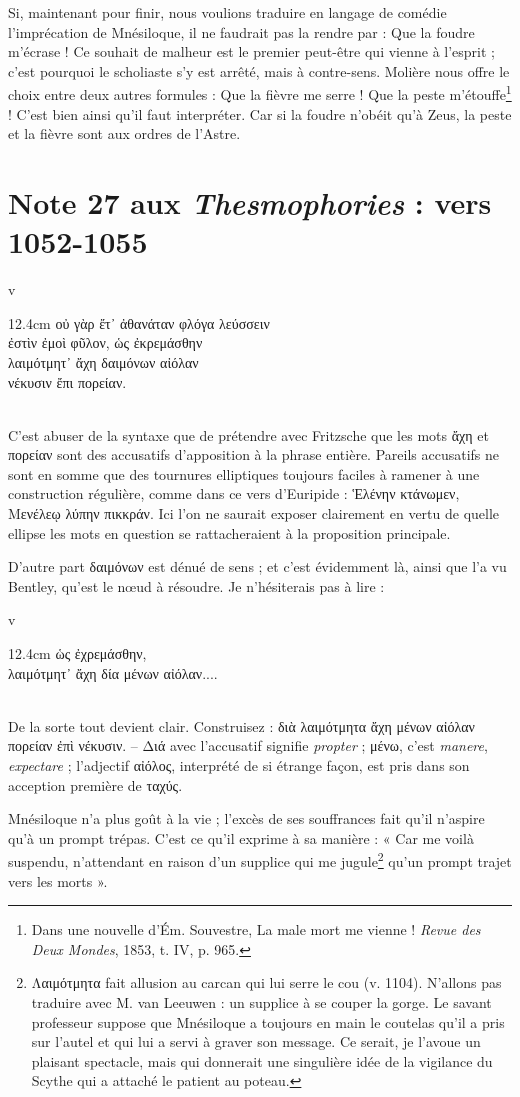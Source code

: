 \documentclass{book}%
\newcommand{\italique}[1]{\textit{#1}}%
\newcommand{\espace}[1]{\hspace{#1}}%
\newlength{\larg}%
\newcommand{\decalage}[1]{%
\settowidth{\larg}{#1}%
\espace{\larg}%
}
\newcommand{\fantome}{{\color{white}v}}
\newcommand{\Note}[1]{\section*{#1}%
\addcontentsline{toc}{section}{#1}}
\newcommand{\note}[1]{\footnote{#1}}
\newcommand{\citComm}[1]{\fantome\\
\espace{1cm}\begin{minipagewithmarginpars}{12.4cm}%
#1
\end{minipagewithmarginpars}%
}
\begin{document}
Si, maintenant pour finir, nous voulions traduire en langage de comédie l'imprécation de Mnésiloque, il ne faudrait pas la rendre par : Que la foudre m'écrase ! Ce souhait de malheur est le premier peut-être qui vienne à l'esprit ; c'est pourquoi le scholiaste s'y est arrêté, mais à contre-sens. Molière nous offre le choix entre deux autres formules : Que la fièvre me serre ! Que la peste m'étouffe\note{Dans une nouvelle d'Ém. Souvestre, La male mort me vienne ! \italique{Revue des Deux Mondes}, 1853, t. IV, p. 965.} ! C'est bien ainsi qu'il faut interpréter. Car si la foudre n'obéit qu'à Zeus, la peste et la fièvre sont aux ordres de l'Astre.



\Note{Note 27 aux \italique{Thesmophories} : vers 1052-1055}


\citComm{οὐ γὰρ ἔτ᾽ ἀθανάταν φλόγα λεύσσειν\\
	ἐστὶν ἐμοὶ φῦλον, ὡς ἐκρεμάσθην\\
	λαιμότμητ᾽ ἄχη δαιμόνων αἰόλαν\\
	νέκυσιν ἔπι πορείαν.}\\

C'est abuser de la syntaxe que de prétendre avec Fritzsche que les mots ἄχη et πορείαν sont des accusatifs d'apposition à la phrase entière. Pareils accusatifs ne sont en somme que des tournures elliptiques toujours faciles à ramener à une construction régulière, comme dans ce vers d'Euripide : Ἑλένην κτάνωμεν, Μενέλεῳ λύπην πικκράν. Ici l'on ne saurait exposer clairement en vertu de quelle ellipse les mots en question se rattacheraient à la proposition principale. 

D'autre part δαιμόνων est dénué de sens ; et c'est évidemment là, ainsi que l'a vu Bentley, qu'est le nœud à résoudre. Je n'hésiterais pas à lire :

\citComm{\decalage{ἐστὶν ἐμοὶ φῦλον, }ὡς ἐχρεμάσθην,\\
	λαιμότμητ᾽ ἄχη δία μένων αἰόλαν....}\\

De la sorte tout devient clair. Construisez : διὰ λαιμότμητα ἄχη μένων αἰόλαν πορείαν ἐπὶ νέκυσιν. -- Διά avec l'accusatif signifie \italique{propter} ; μένω, c'est \italique{manere}, \italique{expectare} ; l'adjectif αἰόλος, interprété de si étrange façon, est pris dans son acception première de ταχύς.

Mnésiloque n'a plus goût à la vie ; l'excès de ses souffrances fait qu'il n'aspire qu'à un prompt trépas. C'est ce qu'il exprime à sa manière : « Car me voilà suspendu, n'attendant en raison d'un supplice qui me jugule\note{Λαιμότμητα fait allusion au carcan qui lui serre le cou (v. 1104). N'allons pas traduire avec M. van Leeuwen : un supplice à se couper la gorge. Le savant professeur suppose que Mnésiloque a toujours en main le coutelas qu'il a pris sur l'autel et qui lui a servi à graver son message. Ce serait, je l'avoue un plaisant spectacle, mais qui donnerait une singulière idée de la vigilance du Scythe qui a attaché le patient au poteau.} qu'un prompt trajet vers les morts ». 
\end{document}
